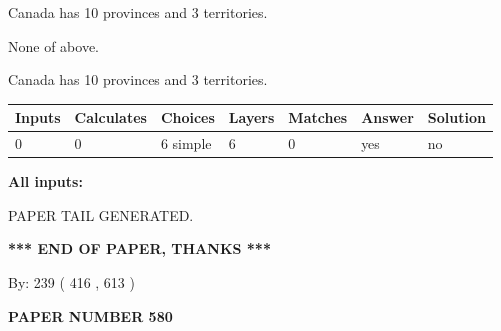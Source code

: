 \documentclass[12pt]{article}
\begin{document}
 
Canada has 10  provinces and 3 territories.
 
 
 None of above.
 
 
\noindent{}
 
 
Canada has 10  provinces and 3 territories.
 
 
\noindent{}
 
 
   
   
   
   
\noindent\begin{tabular}{|l|l|l|l|l|l|l|}
 \hline
Inputs & Calculates & Choices & Layers & Matches & Answer & Solution \\ \hline
 0  & 
 0  & 
 6
  simple  
  & 
 6  & 
 0  & 
  yes & 
  no 
  \\ \hline
 \end{tabular}
   
   
   
   
\noindent{}
   
   
   
   
\noindent\vspace{0.1in}\hspace{-0.08in} {\textbf{\Large{All inputs: }}}
   
   
   
   
   
   
 \vspace{0.2in}
 
   
   
\vspace{2.0in} PAPER TAIL GENERATED.
   
   
   
   
\vspace{1.0in} 
{\textbf{\large{ *** END OF PAPER, THANKS *** }}} 
   
   
\hspace{1.0in} By: 
 239 ( 416 ,  613 )
   
   
   
   
\newpage 
\setcounter{page}{ 
   580001 } 
   
   
   
   
 {\textbf{ \Large{ PAPER NUMBER  580  }}}
   
\end{document}
